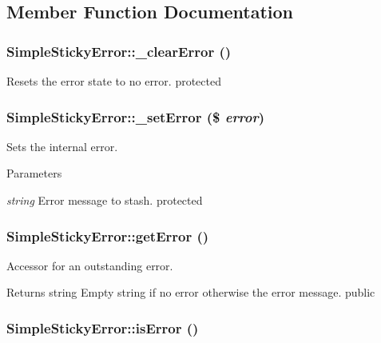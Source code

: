 \subsection{Member Function Documentation}
\hypertarget{class_simple_sticky_error_aeb95775c3c9b3a66a3292838a86c6bbc}{
\subsubsection[{\_\-clearError}]{\setlength{\rightskip}{0pt plus 5cm}SimpleStickyError::\_\-clearError ()}}
\label{class_simple_sticky_error_aeb95775c3c9b3a66a3292838a86c6bbc}
Resets the error state to no error.  protected \hypertarget{class_simple_sticky_error_abbb02ba21c518eacef14ad26dbd07147}{
\subsubsection[{\_\-setError}]{\setlength{\rightskip}{0pt plus 5cm}SimpleStickyError::\_\-setError (\$ {\em error})}}
\label{class_simple_sticky_error_abbb02ba21c518eacef14ad26dbd07147}
Sets the internal error. 
\begin{DoxyParams}{Parameters}
\item[{\em string}]Error message to stash.  protected \end{DoxyParams}
\hypertarget{class_simple_sticky_error_a377b1930966cc852d9572445485a7471}{
\subsubsection[{getError}]{\setlength{\rightskip}{0pt plus 5cm}SimpleStickyError::getError ()}}
\label{class_simple_sticky_error_a377b1930966cc852d9572445485a7471}
Accessor for an outstanding error. \begin{DoxyReturn}{Returns}
string Empty string if no error otherwise the error message.  public 
\end{DoxyReturn}
\hypertarget{class_simple_sticky_error_a37e83b42c631c9650c2920913d0b0bc3}{
\subsubsection[{isError}]{\setlength{\rightskip}{0pt plus 5cm}SimpleStickyError::isError ()}}
